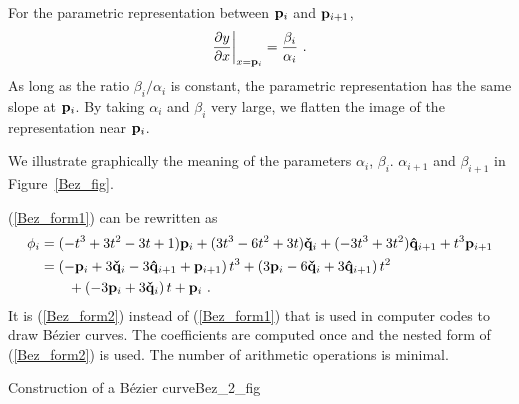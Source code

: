 For the parametric representation between $\mathbf{p}_i$ and $\mathbf{p}_{i+1}$,
\[
\frac{\partial{y}}{\partial{x}}\bigg|_{x=\mathbf{p}_i} = \frac{\beta_i}{\alpha_i}\ .
\]
As long as the ratio $\beta_i/\alpha_i$ is
constant, the parametric representation has the same slope at
$\mathbf{p}_i$.  By taking $\alpha_i$ and $\beta_i$ very large, we
flatten the image of the representation near $\mathbf{p}_i$.

We illustrate graphically the meaning
of the parameters $\alpha_i$, $\beta_i$. $\alpha_{i+1}$ and
$\beta_{i+1}$ in Figure~\ref{Bez_fig}.


(\ref{Bez_form1}) can be rewritten as
\begin{align}
\mathbf{\phi}_i &= (-t^3+3t^2-3t+1) \mathbf{p}_i + (3t^3-6t^2+3t) \mathbf{\check{q}}_i +
(-3t^3+3t^2) \mathbf{\hat{q}}_{i+1} + t^3 \mathbf{p}_{i+1} \nonumber \\
&= \left(-\mathbf{p}_i +3\mathbf{\check{q}}_i - 3 \mathbf{\hat{q}}_{i+1} +
\mathbf{p}_{i+1}\right) t^3 + \left(3 \mathbf{p}_i -6 \mathbf{\check{q}}_i
 + 3 \mathbf{\hat{q}}_{i+1}\right) t^2 \nonumber \\
&\qquad + \left(-3 \mathbf{p}_i + 3  \mathbf{\check{q}}_i\right) t + \mathbf{p}_i \ .
\label{Bez_form2}
\end{align}
It is (\ref{Bez_form2}) instead of (\ref{Bez_form1}) that is used in
computer codes to draw Bézier curves.  The coefficients are computed
once and the nested form of (\ref{Bez_form2}) is used.  The number of
arithmetic operations is minimal.

{Construction of a Bézier curve}{Bez_2_fig}

